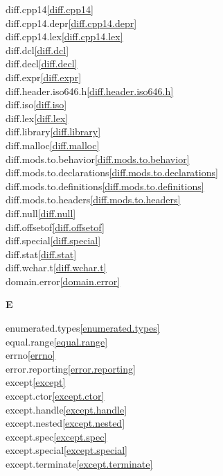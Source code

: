 \begin{multicols}{2}
diff.cpp14\quad\ref{diff.cpp14}\\
diff.cpp14.depr\quad\ref{diff.cpp14.depr}\\
diff.cpp14.lex\quad\ref{diff.cpp14.lex}\\
diff.dcl\quad\ref{diff.dcl}\\
diff.decl\quad\ref{diff.decl}\\
diff.expr\quad\ref{diff.expr}\\
diff.header.iso646.h\quad\ref{diff.header.iso646.h}\\
diff.iso\quad\ref{diff.iso}\\
diff.lex\quad\ref{diff.lex}\\
diff.library\quad\ref{diff.library}\\
diff.malloc\quad\ref{diff.malloc}\\
diff.mods.to.behavior\quad\ref{diff.mods.to.behavior}\\
diff.mods.to.declarations\quad\ref{diff.mods.to.declarations}\\
diff.mods.to.definitions\quad\ref{diff.mods.to.definitions}\\
diff.mods.to.headers\quad\ref{diff.mods.to.headers}\\
diff.null\quad\ref{diff.null}\\
diff.offsetof\quad\ref{diff.offsetof}\\
diff.special\quad\ref{diff.special}\\
diff.stat\quad\ref{diff.stat}\\
diff.wchar.t\quad\ref{diff.wchar.t}\\
domain.error\quad\ref{domain.error}\\
\par \textbf{E}\par
enumerated.types\quad\ref{enumerated.types}\\
equal.range\quad\ref{equal.range}\\
errno\quad\ref{errno}\\
error.reporting\quad\ref{error.reporting}\\
except\quad\ref{except}\\
except.ctor\quad\ref{except.ctor}\\
except.handle\quad\ref{except.handle}\\
except.nested\quad\ref{except.nested}\\
except.spec\quad\ref{except.spec}\\
except.special\quad\ref{except.special}\\
except.terminate\quad\ref{except.terminate}\\

\end{multicols}
